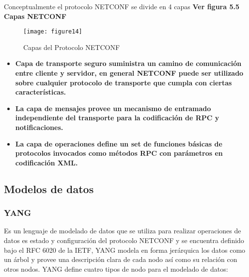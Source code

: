 Conceptualmente el protocolo NETCONF se divide en 4 capas \textbf{Ver figura 5.5 Capas NETCONF}


\begin{figure}[htbp]
  \centering
    {\texttt{[image: figure14]}}%
  \caption{Capas del Protocolo NETCONF}
  \label{fig:fig2subfig}
\end{figure}

\begin{itemize}
\item\textbf{Capa de transporte seguro suministra un camino de comunicación entre cliente y servidor, en general NETCONF puede ser utilizado sobre cualquier protocolo de transporte que cumpla con ciertas características.
}
\item\textbf{La capa de mensajes provee un mecanismo de entramado independiente del transporte para la codificación de RPC y notificaciones.}
\item\textbf{La capa de operaciones define un set de funciones básicas de protocolos invocados como métodos RPC con parámetros en codificación XML.}
\end{itemize}


\subsection{Modelos de datos}
\label{sec:Modelos de datos}

\subsubsection{YANG}
\label{sec:YANG}


Es un lenguaje de modelado de datos que se utiliza para realizar operaciones de datos es estado y configuración del protocolo NETCONF y se encuentra definido bajo el RFC 6020 de la IETF, YANG modela en forma jerárquica los datos como un árbol y provee una descripción clara de cada nodo así como su relación con otros nodos.
YANG define cuatro tipos de nodo para el modelado de datos:

